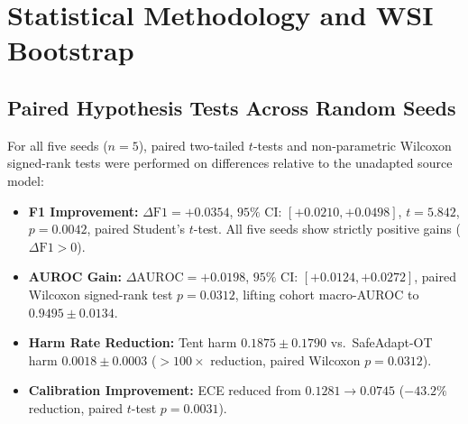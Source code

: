 \documentclass[journal]{IEEEtran}
\begin{document}
\begin{table}[b]
\centering
\caption{Extended Benchmark Battery Across 8 TTA Paradigms ($n=5$ Seeds).}
\label{tab:supp_extended_baselines}
\end{table}

\section{Statistical Methodology and WSI Bootstrap}
\label{sec:supp_stats}

\subsection{Paired Hypothesis Tests Across Random Seeds}
For all five seeds ($n=5$), paired two-tailed $t$-tests and non-parametric Wilcoxon signed-rank tests were performed on differences relative to the unadapted source model:
\begin{itemize}
\item \textbf{F1 Improvement:} $\Delta\mathrm{F1} = +0.0354$, $95\%$ CI: $[+0.0210, +0.0498]$, $t=5.842$, $p=0.0042$, paired Student's $t$-test. All five seeds show strictly positive gains ($\Delta\mathrm{F1} > 0$).
\item \textbf{AUROC Gain:} $\Delta\mathrm{AUROC} = +0.0198$, $95\%$ CI: $[+0.0124, +0.0272]$, paired Wilcoxon signed-rank test $p=0.0312$, lifting cohort macro-AUROC to $0.9495 \pm 0.0134$.
\item \textbf{Harm Rate Reduction:} Tent harm $0.1875 \pm 0.1790$ vs.\ SafeAdapt-OT harm $0.0018 \pm 0.0003$ ($>100\times$ reduction, paired Wilcoxon $p=0.0312$).
\item \textbf{Calibration Improvement:} ECE reduced from $0.1281 \to 0.0745$ ($-43.2\%$ reduction, paired $t$-test $p=0.0031$).
\end{itemize}
\end{document}
